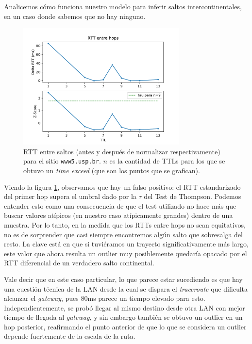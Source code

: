 Analicemos cómo funciona nuestro modelo para inferir saltos intercontinentales, en un caso donde sabemos que no hay ninguno.

\begin{figure}[H]
  \centering
  \includegraphics[width=8.5cm]{figs/traceroute-saopaulo.pdf}
  \caption{\footnotesize RTT entre saltos (antes y después de normalizar respectivamente) para el sitio \texttt{www5.usp.br}. $n$ es la cantidad de TTLs para los que se obtuvo un \emph{time exceed} (que son los puntos que se grafican).}
  \label{plot-saopaulo}
\end{figure}

Viendo la figura \ref{plot-saopaulo}, observamos que hay un falso positivo: el RTT estandarizado del primer hop supera el umbral dado por la $\tau$ del Test de Thompson. Podemos entender esto como una consecuencia de que el test utilizado no hace más que buscar valores atípicos (en nuestro caso atípicamente grandes) dentro de una muestra. Por lo tanto, en la medida que los RTTs entre hops no sean equitativos, no es de sorprender que casi siempre encontremos algún salto que sobresalga del resto. La clave está en que si tuviéramos un trayecto significativamente más largo, este valor que ahora resulta un outlier muy posiblemente quedaría opacado por el RTT diferencial de un verdadero salto continental.

Vale decir que en este caso particular, lo que parece estar sucediendo es que hay una cuestión técnica de la LAN desde la cual se dispara el \emph{traceroute} que dificulta alcanzar el \emph{gateway}, pues 80ms parece un tiempo elevado para esto. Independientemente, se probó llegar al mismo destino desde otra LAN con mejor tiempo de llegada al \emph{gateway}, y sin embargo también se obtuvo un outlier en un hop posterior, reafirmando el punto anterior de que lo que se considera un outlier depende fuertemente de la escala de la ruta. 

